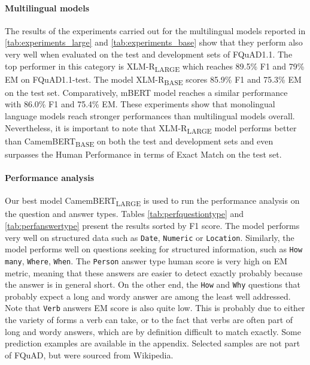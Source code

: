 \documentclass{article}
\begin{document}
\paragraph{Multilingual models}
The results of the experiments carried out for the multilingual models reported in \ref{tab:experiments_large} and \ref{tab:experiments_base} show that they perform also very well when evaluated on the test and development sets of FQuAD1.1.
The top performer in this category is XLM-R\textsubscript{LARGE} which reaches 89.5\% F1 and 79\% EM on FQuAD1.1-test.
The model XLM-R\textsubscript{BASE} scores 85.9\% F1 and 75.3\% EM on the test set.
Comparatively, mBERT model reaches a similar performance with 86.0\% F1 and 75.4\% EM.
These experiments show that monolingual language models reach stronger performances than multilingual models overall.
Nevertheless, it is important to note that XLM-R\textsubscript{LARGE} model performs better than CamemBERT\textsubscript{BASE} on both the test and development sets and even surpasses the Human Performance in terms of Exact Match on the test set.

\paragraph{Performance analysis}
Our best model CamemBERT\textsubscript{LARGE} is used to run the performance analysis on the question and answer types.
Tables \ref{tab:perfquestiontype} and \ref{tab:perfanswertype} present the results sorted by F1 score.
The model performs very well on structured data such as \texttt{Date}, \texttt{Numeric} or \texttt{Location}. 
Similarly, the model performs well on questions seeking for structured information, such as \texttt{How many}, \texttt{Where}, \texttt{When}.
The \texttt{Person} answer type human score is very high on EM metric, meaning that these answers are easier to detect exactly probably because the answer is in general short.
On the other end, the \texttt{How} and \texttt{Why} questions that probably expect a long and wordy answer are among the least well addressed. 
Note that \texttt{Verb} answers EM score is also quite low. 
This is probably due to either the variety of forms a verb can take, or to the fact that verbs are often part of long and wordy answers, which are by definition difficult to match exactly.
Some prediction examples are available in the appendix. 
Selected samples are not part of FQuAD, but were sourced from Wikipedia.
\end{document}
